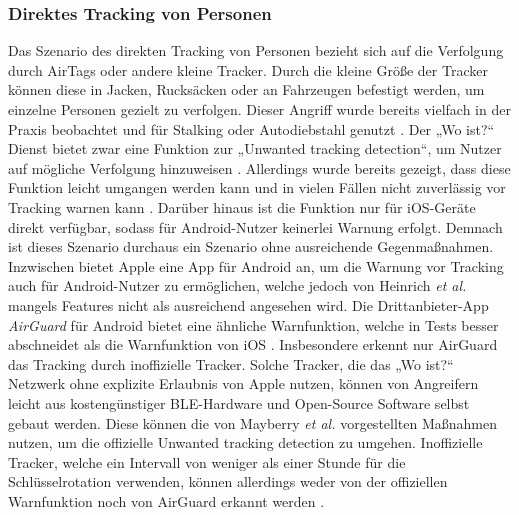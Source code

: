 \subsubsection{Direktes Tracking von Personen}
Das Szenario des direkten Tracking von Personen bezieht sich auf die Verfolgung durch AirTags oder andere kleine Tracker.
Durch die kleine Größe der Tracker können diese in Jacken, Rucksäcken oder an Fahrzeugen befestigt werden, um einzelne Personen gezielt zu verfolgen.
Dieser Angriff wurde bereits vielfach in der Praxis beobachtet und für Stalking oder Autodiebstahl genutzt \cite{NYT_Airtags}.
Der „Wo ist?“ Dienst bietet zwar eine Funktion zur „Unwanted tracking detection“, um Nutzer auf mögliche Verfolgung hinzuweisen \cite{Apple_FindMySpec}.
Allerdings wurde bereits gezeigt, dass diese Funktion leicht umgangen werden kann \cite{Mayberry_Tracking} und in vielen Fällen nicht zuverlässig vor Tracking warnen kann \cite{Heinrich_AirGuard}.
Darüber hinaus ist die Funktion nur für iOS-Geräte direkt verfügbar, sodass für Android-Nutzer keinerlei Warnung erfolgt.
Demnach ist dieses Szenario durchaus ein Szenario ohne ausreichende Gegenmaßnahmen.
Inzwischen bietet Apple eine App für Android an, um die Warnung vor Tracking auch für Android-Nutzer zu ermöglichen, welche jedoch von Heinrich \textit{et al.} \cite{Heinrich_AirGuard} mangels Features nicht als ausreichend angesehen wird.
Die Drittanbieter-App \textit{AirGuard} für Android bietet eine ähnliche Warnfunktion, welche in Tests besser abschneidet als die Warnfunktion von iOS \cite{Heinrich_AirGuard}.
Insbesondere erkennt nur AirGuard das Tracking durch inoffizielle Tracker.
Solche Tracker, die das „Wo ist?“ Netzwerk ohne explizite Erlaubnis von Apple nutzen, können von Angreifern leicht aus kostengünstiger \ac{BLE}-Hardware und Open-Source Software selbst gebaut werden.
Diese können die von Mayberry \textit{et al.} \cite{Mayberry_Tracking} vorgestellten Maßnahmen nutzen, um die offizielle Unwanted tracking detection zu umgehen.
Inoffizielle Tracker, welche ein Intervall von weniger als einer Stunde für die Schlüsselrotation verwenden, können allerdings weder von der offiziellen Warnfunktion noch von AirGuard erkannt werden \cite{Heinrich_AirGuard}.


